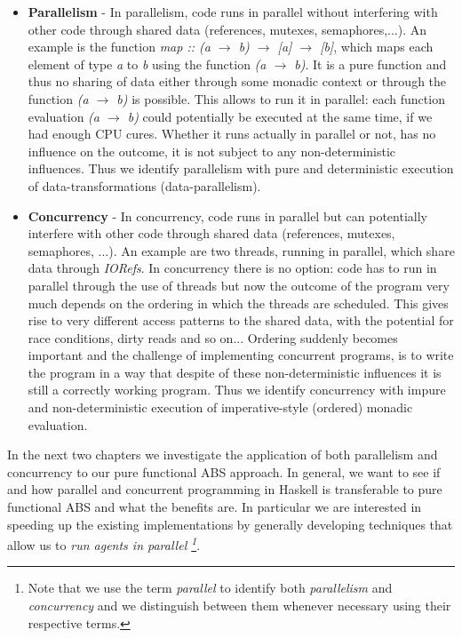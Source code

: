 \begin{itemize}
	\item \textbf{Parallelism} - In parallelism, code runs in parallel without interfering with other code through shared data (references, mutexes, semaphores,...). An example is the function \textit{map :: (a $\rightarrow$ b) $\rightarrow$ [a] $\rightarrow$ [b]}, which maps each element of type \textit{a} to \textit{b} using the function \textit{(a $\rightarrow$ b)}. It is a pure function and thus no sharing of data either through some monadic context or through the function \textit{(a $\rightarrow$ b)} is possible. This allows to run it in parallel: each function evaluation \textit{(a $\rightarrow$ b)} could potentially be executed at the same time, if we had enough CPU cures. Whether it runs actually in parallel or not, has no influence on the outcome, it is not subject to any non-deterministic influences. Thus we identify parallelism with pure and deterministic execution of data-transformations (data-parallelism).
	
	\item \textbf{Concurrency} - In concurrency, code runs in parallel but can potentially interfere with other code through shared data (references, mutexes, semaphores, ...). An example are two threads, running in parallel, which share data through \textit{IORefs}. In concurrency there is no option: code has to run in parallel through the use of threads but now the outcome of the program very much depends on the ordering in which the threads are scheduled. This gives rise to very different access patterns to the shared data, with the potential for race conditions, dirty reads and so on... Ordering suddenly becomes important and the challenge of implementing concurrent programs, is to write the program in a way that despite of these non-deterministic influences it is still a correctly working program. Thus we identify concurrency with impure and non-deterministic execution of imperative-style (ordered) monadic evaluation.
\end{itemize}

In the next two chapters we investigate the application of both parallelism and concurrency to our pure functional ABS approach. In general, we want to see if and how parallel and concurrent programming in Haskell is transferable to pure functional ABS and what the benefits are. In particular we are interested in speeding up the existing implementations by generally developing techniques that allow us to  \textit{run agents in parallel \footnote{Note that we use the term \textit{parallel} to identify both \textit{parallelism} and \textit{concurrency} and we distinguish between them whenever necessary using their respective terms.}}. 

